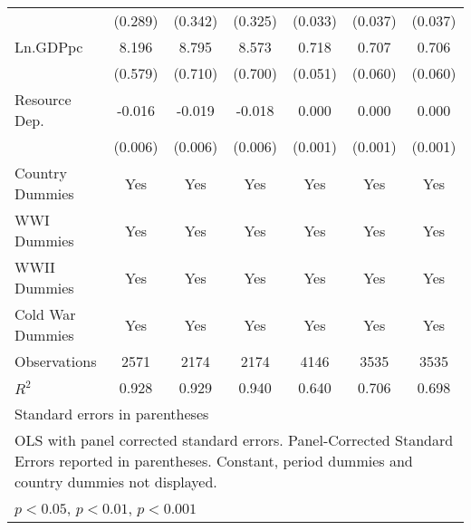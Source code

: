 \begin{table}[htbp]
\begin{tabular}{l*{6}{c}}
                    &     (0.289)         &     (0.342)         &     (0.325)         &     (0.033)         &     (0.037)         &     (0.037)         \\
[1em]
Ln.GDPpc            &       8.196\sym{***}&       8.795\sym{***}&       8.573\sym{***}&       0.718\sym{***}&       0.707\sym{***}&       0.706\sym{***}\\
                    &     (0.579)         &     (0.710)         &     (0.700)         &     (0.051)         &     (0.060)         &     (0.060)         \\
[1em]
Resource Dep.       &      -0.016\sym{**} &      -0.019\sym{**} &      -0.018\sym{**} &       0.000         &       0.000         &       0.000         \\
                    &     (0.006)         &     (0.006)         &     (0.006)         &     (0.001)         &     (0.001)         &     (0.001)         \\
[1em]
Country Dummies     &         Yes         &         Yes         &         Yes         &         Yes         &         Yes         &         Yes         \\
[1em]
WWI Dummies         &         Yes         &         Yes         &         Yes         &         Yes         &         Yes         &         Yes         \\
[1em]
WWII Dummies        &         Yes         &         Yes         &         Yes         &         Yes         &         Yes         &         Yes         \\
[1em]
Cold War Dummies    &         Yes         &         Yes         &         Yes         &         Yes         &         Yes         &         Yes         \\
\hline
Observations        &        2571         &        2174         &        2174         &        4146         &        3535         &        3535         \\
\(R^{2}\)           &       0.928         &       0.929         &       0.940         &       0.640         &       0.706         &       0.698         \\
\hline\hline
\multicolumn{7}{l}{\footnotesize Standard errors in parentheses}\\
\multicolumn{7}{l}{\footnotesize OLS with panel corrected standard errors. Panel-Corrected Standard Errors reported in parentheses. Constant, period dummies and country dummies not displayed.}\\
\multicolumn{7}{l}{\footnotesize \sym{*} \(p<0.05\), \sym{**} \(p<0.01\), \sym{***} \(p<0.001\)}\\
\end{tabular}
\end{table}
